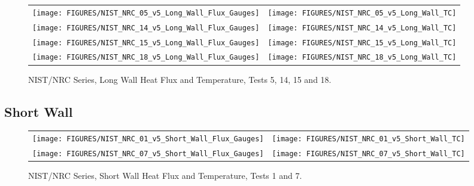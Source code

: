 \begin{figure}[p]
\begin{tabular*}{\textwidth}{l@{\extracolsep{\fill}}r}
\texttt{[image: FIGURES/NIST\_NRC\_05\_v5\_Long\_Wall\_Flux\_Gauges]} &
\texttt{[image: FIGURES/NIST\_NRC\_05\_v5\_Long\_Wall\_TC]} \\
\texttt{[image: FIGURES/NIST\_NRC\_14\_v5\_Long\_Wall\_Flux\_Gauges]} &
\texttt{[image: FIGURES/NIST\_NRC\_14\_v5\_Long\_Wall\_TC]} \\
\texttt{[image: FIGURES/NIST\_NRC\_15\_v5\_Long\_Wall\_Flux\_Gauges]} &
\texttt{[image: FIGURES/NIST\_NRC\_15\_v5\_Long\_Wall\_TC]} \\
\texttt{[image: FIGURES/NIST\_NRC\_18\_v5\_Long\_Wall\_Flux\_Gauges]} &
\texttt{[image: FIGURES/NIST\_NRC\_18\_v5\_Long\_Wall\_TC]}
\end{tabular*}
\caption{NIST/NRC Series, Long Wall Heat Flux and Temperature, Tests 5, 14, 15 and 18.}
\label{NIST_NRC_Long_4}
\end{figure}

\clearpage



\subsection{Short Wall}

\vspace{2in}


\begin{figure}[h!]
\begin{tabular*}{\textwidth}{l@{\extracolsep{\fill}}r}
\texttt{[image: FIGURES/NIST\_NRC\_01\_v5\_Short\_Wall\_Flux\_Gauges]} &
\texttt{[image: FIGURES/NIST\_NRC\_01\_v5\_Short\_Wall\_TC]} \\
\texttt{[image: FIGURES/NIST\_NRC\_07\_v5\_Short\_Wall\_Flux\_Gauges]} &
\texttt{[image: FIGURES/NIST\_NRC\_07\_v5\_Short\_Wall\_TC]}

\end{tabular*}
\caption{NIST/NRC Series, Short Wall Heat Flux and Temperature, Tests 1 and 7.}
\label{NIST_NRC_Short_1}
\end{figure}


